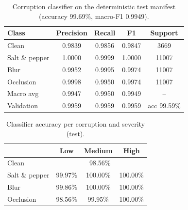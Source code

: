 \begin{table}[t]\centering\caption{Corruption classifier on the deterministic test manifest (accuracy 99.69\%, macro-F1 0.9949).}\label{tab:clf}
\begin{tabular}{lcccc}\toprule Class & Precision & Recall & F1 & Support\\\midrule
Clean & 0.9839 & 0.9856 & 0.9847 & 3669\\
Salt \& pepper & 1.0000 & 0.9999 & 1.0000 & 11007\\
Blur & 0.9952 & 0.9995 & 0.9974 & 11007\\
Occlusion & 0.9998 & 0.9950 & 0.9974 & 11007\\
\midrule Macro avg & 0.9947 & 0.9950 & 0.9949 & --\\
Validation & 0.9959 & 0.9959 & 0.9959 & acc 99.59\%\\
\bottomrule\end{tabular}\end{table}

\begin{table}[t]\centering\caption{Classifier accuracy per corruption and severity (test).}\label{tab:clfsev}
\begin{tabular}{lccc}\toprule & Low & Medium & High\\\midrule
Clean & \multicolumn{3}{c}{98.56\%}\\
Salt \& pepper & 99.97\% & 100.00\% & 100.00\%\\
Blur & 99.86\% & 100.00\% & 100.00\%\\
Occlusion & 98.56\% & 99.95\% & 100.00\%\\
\bottomrule\end{tabular}\end{table}